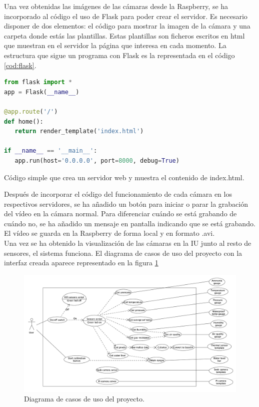 Una vez obtenidas las imágenes de las cámaras desde la Raspberry, se ha incorporado al código el uso de Flask para poder crear el servidor. Es necesario disponer de dos elementos: el código para mostrar la imagen de la cámara y una carpeta donde estás las plantillas. Estas plantillas son ficheros escritos en html que muestran en el servidor la página que interesa en cada momento. La estructura que sigue un programa con Flask es la representada en el código \ref{cod:flask}.\\
\begin{code}[h]
\begin{lstlisting}[language=Python]
from flask import *
app = Flask(__name__)

@app.route('/')
def home():
   return render_template('index.html')

if __name__ == '__main__':
   app.run(host='0.0.0.0', port=8000, debug=True)
\end{lstlisting}
\caption[Código simple que crea un servidor web en el puerto 8000 y muestra el contenido de index.html.]{Código simple que crea un servidor web y muestra el contenido de index.html.}
\label{cod:flask}
\end{code}

Después de incorporar el código del funcionamiento de cada cámara en los respectivos servidores, se ha añadido un botón para iniciar o parar la grabación del vídeo en la cámara normal. Para diferenciar cuándo se está grabando de cuándo no, se ha añadido un mensaje en pantalla indicando que se está grabando. El vídeo se guarda en la Raspberry de forma local y en formato .avi.\\

Una vez se ha obtenido la visualización de las cámaras en la IU junto al resto de sensores, el sistema funciona. El diagrama de casos de uso del proyecto con la interfaz creada aparece representado en la figura \ref{fig:casos}
\begin{figure} [h!]
  \begin{center}
    \includegraphics[width=17cm]{figs/casos}
  \end{center}
  \caption{Diagrama de casos de uso del proyecto.}
  \label{fig:casos}
\end{figure}\\

